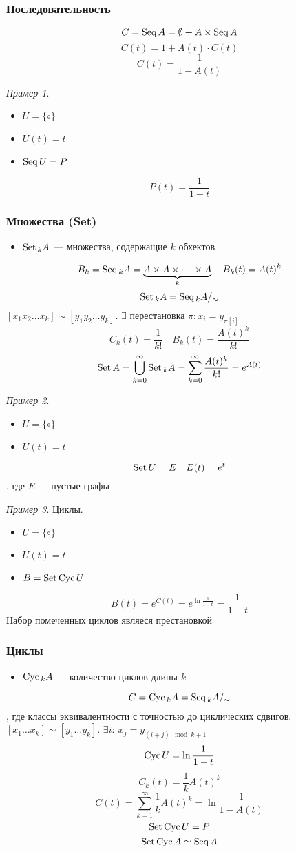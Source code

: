 \documentclass[english]{article}
\theoremstyle{plain}
\theoremstyle{remark}
\newtheorem*{examp}{Пример}
\theoremstyle{definition}
\begin{document}
\subsubsection{Последовательность}
\label{sec:org7361d1b}
\[ C = \text{Seq}\, A = \emptyset + A \times \text{Seq}\, A \]
\[ C(t) = 1 + A(t)\cdot C(t) \]
\[ C(t) = \frac{1}{1 - A(t)} \]
\begin{examp}
\-
\begin{itemize}
\item \(U = \{\circ\}\)
\item \(U(t) = t\)
\item \(\text{Seq}\, U = P\)
\end{itemize}
\[P(t) = \frac{1}{1 - t}\]
\end{examp}
\subsubsection{Множества (Set)}
\label{sec:org119bc2f}
\begin{itemize}
\item \(\text{Set}\,_k A\) ---  множества, содержащие \(k\) обхектов
\end{itemize}
\[ B_k = \text{Seq}\,_k A = \underbrace{A \times A \times \dots \times A}_k\quad B_k(t) = A(t)^k \]
\[ \text{Set}\,_k A = \text{Seq}\,_k A /_\sim\]
\([x_1 x_2 \dots x_k] \sim [y_1 y_2 \dots y_k]\). \(\exists\) перестановка \(\pi: x_i = y_{\pi[i]}\)
\[ C_k(t) = \frac{1}{k!}\quad B_k(t) = \frac{A(t)^k}{k!} \]
\[ \text{Set}\, A = \bigcup_{k = 0}^{\infty} \text{Set}\,_k A = \sum_{k = 0}^\infty \frac{A(t)^k}{k!} = e^{A(t)} \]
\begin{examp}
\-
\begin{itemize}
\item \(U = \{\circ\}\)
\item \(U(t) = t\)
\end{itemize}
\[ \text{Set}\, U = E\quad E(t) = e^t \]
, где \(E\) --- пустые графы
\end{examp}
\begin{examp}
Циклы.
\begin{itemize}
\item \(U = \{\circ\}\)
\item \(U(t) = t\)
\item \(B = \text{Set}\, \text{Cyc}\, U\)
\end{itemize}
\[ B(t) = e^{C(t)} = e^{\ln \frac{1}{1 - t}} = \frac{1}{1 - t} \]
Набор помеченных циклов являеся престановкой
\end{examp}
\subsubsection{Циклы}
\label{sec:org02fe53c}
\begin{itemize}
\item \(\text{Cyc}\,_k A\) --- количество циклов длины \(k\)
\end{itemize}
\[ C = \text{Cyc}\,_k A = \text{Seq}\,_k A /_\sim \], где классы эквивалентности с точностью до циклических сдвигов. \\
\([x_1\dots x_k] \sim [y_1 \dots y_k]\). \(\exists i:\ x_j = y_{(i + j)\mod k + 1}\)
\[ \text{Cyc}\, U = \ln\frac{1}{1 - t} \]
\[ C_k(t) = \frac{1}{k}A(t)^k \]
\[ C(t) = \sum_{k = 1}^\infty \frac{1}{k} A(t)^k = \ln\frac{1}{1 - A(t)} \]
\[ \text{Set}\,\text{Cyc}\, U = P \]
\[ \text{Set}\, \text{Cyc}\, A \simeq \text{Seq}\, A \]
\end{document}
